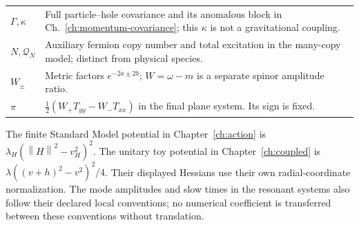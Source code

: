 \documentclass[11pt,a4paper,oneside]{book}
\theoremstyle{plain}
\theoremstyle{definition}
\theoremstyle{remark}
\newcommand{\norm}[1]{\left\lVert#1\right\rVert}
\begin{document}
\begin{center}
\begin{tabularx}{\textwidth}{@{}lX@{}}
$\Gamma,\kappa$ & Full particle--hole covariance and its anomalous block in Ch.~\ref{ch:momentum-covariance}; this $\kappa$ is not a gravitational coupling.\\
$N,\mathcal Q_N$ & Auxiliary fermion copy number and total excitation in the many-copy model; distinct from physical species.\\
$W_\pm$ & Metric factors $e^{-2a\pm2b}$; $W=\omega-m$ is a separate spinor amplitude ratio.\\
$\pi$ & $\tfrac12(W_+T_{yy}-W_-T_{xx})$ in the final plane system. Its sign is fixed.\\
\bottomrule
\end{tabularx}
\end{center}

The finite Standard Model potential in Chapter~\ref{ch:action} is $\lambda_H(\norm H^2-v_H^2)^2$. The unitary toy potential in Chapter~\ref{ch:coupled} is $\lambda((v+h)^2-v^2)^2/4$. Their displayed Hessians use their own radial-coordinate normalization. The mode amplitudes and slow times in the resonant systems also follow their declared local conventions; no numerical coefficient is transferred between these conventions without translation.
\end{document}
